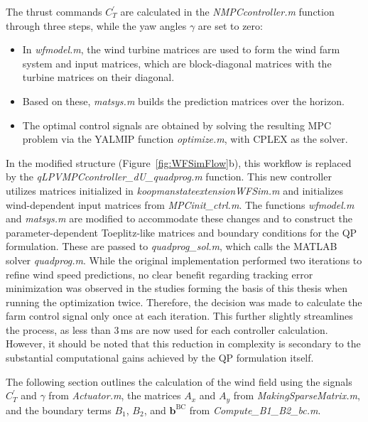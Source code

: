 %
The thrust commands $C^{\prime}_T$ are calculated in the \textit{NMPCcontroller.m} function through three steps, while the yaw angles $\gamma$ are set to zero:
\begin{itemize}
    \item In \textit{wfmodel.m}, the wind turbine matrices are used to form the wind farm system and input matrices, which are block-diagonal matrices with the turbine matrices on their diagonal.
    \item Based on these, \textit{matsys.m} builds the prediction matrices over the horizon.
    \item The optimal control signals are obtained by solving the resulting MPC problem via the YALMIP function \textit{optimize.m}, with CPLEX as the solver.
\end{itemize}
%
In the modified structure (Figure~\ref{fig:WFSimFlow}b), this workflow is replaced by the \textit{qLPVMPCcontroller\_dU\_\allowbreak quadprog.m} function. This new controller utilizes matrices initialized in \textit{koopmanstateextensionWFSim.m} and initializes wind-dependent input matrices from \textit{MPCinit\_ctrl.m}. The functions \textit{wfmodel.m} and \textit{matsys.m} are modified to accommodate these changes and to construct the parameter-dependent Toeplitz-like matrices and boundary conditions for the QP formulation. These are passed to \textit{quadprog\_sol.m}, which calls the MATLAB solver \textit{quadprog.m}. While the original implementation performed two iterations to refine wind speed predictions, no clear benefit regarding tracking error minimization was observed in the studies forming the basis of this thesis when running the optimization twice. Therefore, the decision was made to calculate the farm control signal only once at each iteration. This further slightly streamlines the process, as less than 3\,ms are now used for each controller calculation. However, it should be noted that this reduction in complexity is secondary to the substantial computational gains achieved by the QP formulation itself.

The following section outlines the calculation of the wind field using the signals $C^{\prime}_T$ and $\gamma$ from \textit{Actuator.m}, the matrices $A_x$ and $A_y$ from \textit{MakingSparseMatrix.m}, and the boundary terms $B_1$, $B_2$, and $\bm{b}^\mathrm{BC}$ from \textit{Compute\_B1\_B2\_bc.m}.

